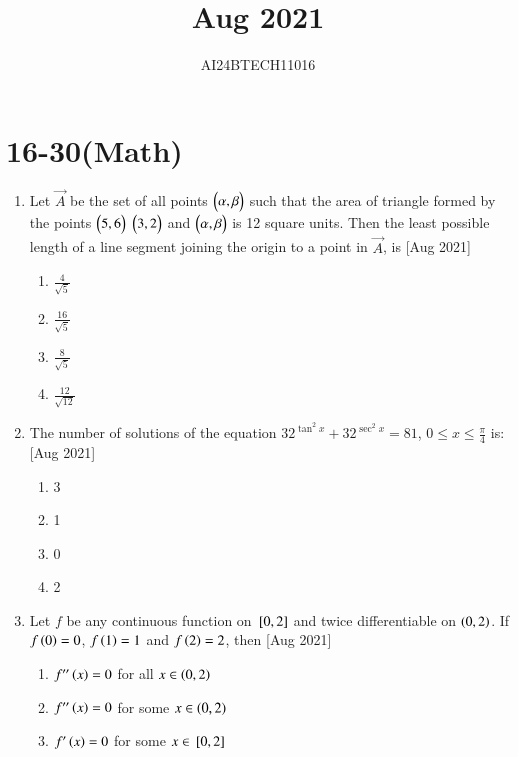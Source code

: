 \documentclass[journal]{IEEEtran}
\begin{document}

\title{Aug 2021}
\author{AI24BTECH11016}
{\let\newpage\relax\maketitle}
\renewcommand{\thefigure}{\theenumi}
\renewcommand{\thetable}{\theenumi}
\setlength{\intextsep}{10pt} %
\renewcommand{\thetable}{\theenumi}
\section{16-30(Math)}
\begin{enumerate}
	\item
	Let $\vec{A}$ be the set of all points $\begin{pmatrix}\alpha , \beta\end{pmatrix}$ such that the area of triangle formed by the points $\begin{pmatrix}5 , 6\end{pmatrix}$ $\begin{pmatrix}3 , 2\end{pmatrix}$ and $\begin{pmatrix}\alpha , \beta\end{pmatrix}$ is 12 square units. Then the least possible length of a line segment joining the origin to a point in $\vec{A}$, is 
	\hfill [Aug 2021]
		\begin{enumerate}
			\item  $\frac{4}{\sqrt{5}}$
			\item  $\frac{16}{\sqrt{5}}$
			\item  $\frac{8}{\sqrt{5}}$
			\item  $\frac{12}{\sqrt{12}}$
		\end{enumerate}
	\item
	The number of solutions of the equation $32^{\tan^{2}{x}} + 32^{\sec^{2}{x}} = 81$, $0 \leq x \leq \frac{\pi}{4}$ is:
	\hfill [Aug 2021]
		\begin{enumerate}
			\item 3
			\item 1
			\item 0
			\item 2
		\end{enumerate}
	\item 
	Let $f$ be any continuous function on ${}\left[0, 2\right]$ and twice differentiable on $\left(0, 2\right)$. If $f\left(0\right) = 0$, $f\left(1\right) = 1$ and $f\left(2\right) = 2$, then
	\hfill [Aug 2021]
		\begin{enumerate}
			\item  $f^{\prime\prime}\left(x\right) = 0$ for all $x \in \left(0, 2\right)$
			\item  $f^{\prime\prime}\left(x\right) = 0$ for some $x \in \left(0, 2\right)$
			\item  $f^{\prime}\left(x\right) = 0$ for some $x \in {}\left[0, 2\right]$

\end{enumerate}
\end{enumerate}
\end{document}
